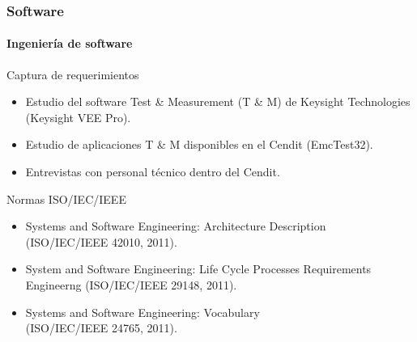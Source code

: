 \documentclass[xcolor=pdftext, table]{beamer}
\begin{document}
	\begin{frame}
		\frametitle{Software}
		\framesubtitle{Ingeniería de software}
		
		\begin{block}{Captura de requerimientos}
			\begin{itemize}
				\item Estudio del software Test \& Measurement (T \& M) de Keysight Technologies (Keysight VEE Pro).
				\item Estudio de aplicaciones T \& M disponibles en el Cendit (EmcTest32).
				\item Entrevistas con personal técnico dentro del Cendit.
			\end{itemize}
		\end{block}	
		
		\begin{block}{Normas ISO/IEC/IEEE}
			\begin{itemize}  
				\small				
				\item Systems and Software Engineering: Architecture Description \\ {\footnotesize (ISO/IEC/IEEE 42010, 2011).}		
				\item System and Software Engineering: Life Cycle Processes Requirements Engineerng {\footnotesize (ISO/IEC/IEEE 29148, 2011).}
				\item Systems and Software Engineering: Vocabulary \\
				 {\footnotesize (ISO/IEC/IEEE 24765, 2011).}	
			\end{itemize}
		\end{block}
	
	\end{frame}
\end{document}

